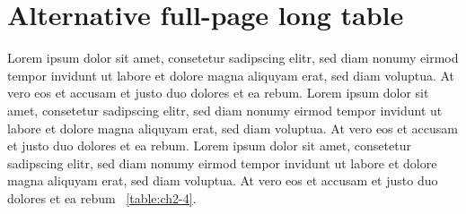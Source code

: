 \section{Alternative full-page long table}

Lorem ipsum dolor sit amet, consetetur sadipscing elitr, sed diam nonumy eirmod tempor invidunt ut labore et dolore magna aliquyam erat, sed diam voluptua. At vero eos et accusam et justo duo dolores et ea rebum. Lorem ipsum dolor sit amet, consetetur sadipscing elitr, sed diam nonumy eirmod tempor invidunt ut labore et dolore magna aliquyam erat, sed diam voluptua. At vero eos et accusam et justo duo dolores et ea rebum. Lorem ipsum dolor sit amet, consetetur sadipscing elitr, sed diam nonumy eirmod tempor invidunt ut labore et dolore magna aliquyam erat, sed diam voluptua. At vero eos et accusam et justo duo dolores et ea rebum \tablename\ \ref{table:ch2-4}.


